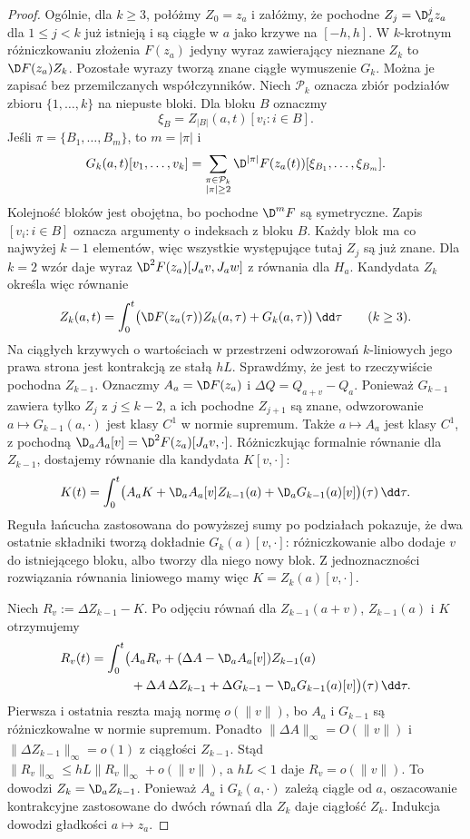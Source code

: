 \begin{proof}
Ogólnie, dla $k\ge3$, połóżmy $Z_0=z_a$ i załóżmy,
że pochodne $Z_j=\D_a^j z_a$ dla $1\le j<k$
już istnieją i są ciągłe w $a$ jako krzywe na $[-h,h]$.
W $k$-krotnym różniczkowaniu złożenia $F(z_a)$ jedyny wyraz
zawierający nieznane $Z_k$ to $\D F(z_a)Z_k$.
Pozostałe wyrazy tworzą znane ciągłe wymuszenie $G_k$.
Można je zapisać bez przemilczanych współczynników.
Niech $\mathcal P_k$ oznacza zbiór podziałów zbioru
$\{1,\ldots,k\}$ na niepuste bloki. Dla bloku $B$ oznaczmy
\[
 \xi_B=Z_{|B|}(a,t)[v_i:i\in B].
\]
Jeśli $\pi=\{B_1,\ldots,B_m\}$, to $m=|\pi|$ i
\[
G_k(a,t)[v_1,\ldots,v_k]
=\sum_{\substack{\pi\in\mathcal P_k\\|\pi|\ge2}}
 \D^{|\pi|}F(z_a(t))
 [\xi_{B_1},\ldots,\xi_{B_m}].
\]
Kolejność bloków jest obojętna, bo pochodne $\D^mF$ są symetryczne.
Zapis $[v_i:i\in B]$ oznacza argumenty o indeksach z bloku $B$.
Każdy blok ma co najwyżej $k-1$ elementów, więc wszystkie
występujące tutaj $Z_j$ są już znane. Dla $k=2$ wzór daje
wyraz $\D^2F(z_a)[J_av,J_aw]$ z równania dla $H_a$.
Kandydata $Z_k$ określa więc równanie
\[
 Z_k(a,t)=\int_0^t\bigl(\D F(z_a(\tau))Z_k(a,\tau)
                         +G_k(a,\tau)\bigr)\,\dd\tau
 \qquad(k\ge3).
\]
Na ciągłych krzywych o wartościach w przestrzeni odwzorowań
$k$-liniowych jego prawa strona jest kontrakcją ze stałą $hL$.
Sprawdźmy, że jest to rzeczywiście pochodna $Z_{k-1}$.
Oznaczmy $A_a=\D F(z_a)$ i $\Delta Q=Q_{a+v}-Q_a$.
Ponieważ $G_{k-1}$ zawiera tylko $Z_j$ z $j\le k-2$,
a ich pochodne $Z_{j+1}$ są znane, odwzorowanie
$a\mapsto G_{k-1}(a,\cdot)$ jest klasy $C^1$ w normie supremum.
Także $a\mapsto A_a$ jest klasy $C^1$, z pochodną
$\D_aA_a[v]=\D^2F(z_a)[J_av,\cdot]$.
Różniczkując formalnie równanie dla $Z_{k-1}$, dostajemy
równanie dla kandydata $K[v,\cdot]$:
\[
K(t)=\int_0^t\bigl(A_aK
 +\D_aA_a[v]Z_{k-1}(a)
 +\D_aG_{k-1}(a)[v]\bigr)(\tau)\,\dd\tau.
\]
Reguła łańcucha zastosowana do powyższej sumy po podziałach
pokazuje, że dwa ostatnie składniki tworzą dokładnie
$G_k(a)[v,\cdot]$: różniczkowanie albo dodaje $v$ do
istniejącego bloku, albo tworzy dla niego nowy blok.
Z jednoznaczności rozwiązania równania liniowego mamy więc
$K=Z_k(a)[v,\cdot]$.

Niech $R_v:=\Delta Z_{k-1}-K$.
Po odjęciu równań dla $Z_{k-1}(a+v)$, $Z_{k-1}(a)$ i $K$
otrzymujemy
\begin{align*}
R_v(t)=\int_0^t\bigl(&A_aR_v
 +(\Delta A-\D_aA_a[v])Z_{k-1}(a)\\
 &+\Delta A\,\Delta Z_{k-1}
 +\Delta G_{k-1}-\D_aG_{k-1}(a)[v]\bigr)(\tau)\,\dd\tau.
\end{align*}
Pierwsza i ostatnia reszta mają normę $o(\|v\|)$,
bo $A_a$ i $G_{k-1}$ są różniczkowalne w normie supremum.
Ponadto $\|\Delta A\|_\infty=O(\|v\|)$ i
$\|\Delta Z_{k-1}\|_\infty=o(1)$ z ciągłości $Z_{k-1}$.
Stąd $\|R_v\|_\infty\leq hL\|R_v\|_\infty+o(\|v\|)$,
a $hL<1$ daje $R_v=o(\|v\|)$.
To dowodzi $Z_k=\D_aZ_{k-1}$.
Ponieważ $A_a$ i $G_k(a,\cdot)$ zależą ciągle od $a$,
oszacowanie kontrakcyjne zastosowane do dwóch równań dla $Z_k$
daje ciągłość $Z_k$. Indukcja dowodzi gładkości $a\mapsto z_a$.


\end{proof}
